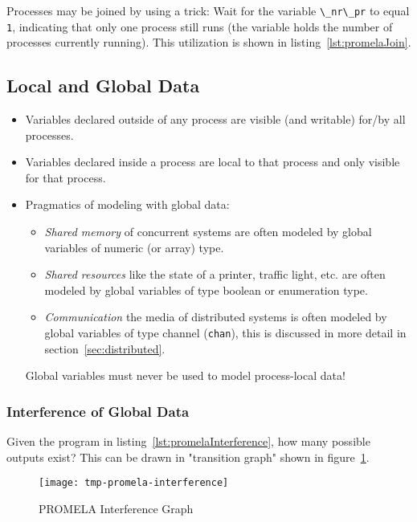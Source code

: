 \documentclass[a4paper, 11pt, accentcolor = tud3b]{tudreport}
\newcommand{\inlinePromela}[1]{\lstinline[language = PROMELA]|#1|}
\begin{document}
				Processes may be joined by using a trick: Wait for the variable \inlinePromela{\_nr\_pr} to equal \inlinePromela{1}, indicating that only one process still runs (the variable holds the number of processes currently running). This utilization is shown in listing~\ref{lst:promelaJoin}.

			\subsection{Local and Global Data}
				\begin{itemize}
					\item Variables declared outside of any process are visible (and writable) for/by all processes.
					\item Variables declared inside a process are local to that process and only visible for that process.
					\item Pragmatics of modeling with global data:
						\begin{itemize}
							\item \textit{Shared memory} of concurrent systems are often modeled by global variables of numeric (or array) type.
							\item \textit{Shared resources} like the state of a printer, traffic light, etc. are often modeled by global variables of type boolean or enumeration type.
							\item \textit{Communication} the media of distributed systems is often modeled by global variables of type channel (\inlinePromela{chan}), this is discussed in more detail in section~\ref{sec:distributed}.
						\end{itemize}
						Global variables must never be used to model process-local data!
				\end{itemize}
			
				\subsubsection{Interference of Global Data}
					
				
					Given the program in listing~\ref{lst:promelaInterference}, how many possible outputs exist? This can be drawn in "transition graph" shown in figure~\ref{fig:promelaInterference}.
					
					\begin{figure}
						\centering
						\texttt{[image: tmp-promela-interference]}
						\caption{PROMELA Interference Graph}
						\label{fig:promelaInterference}
					\end{figure}
\end{document}
